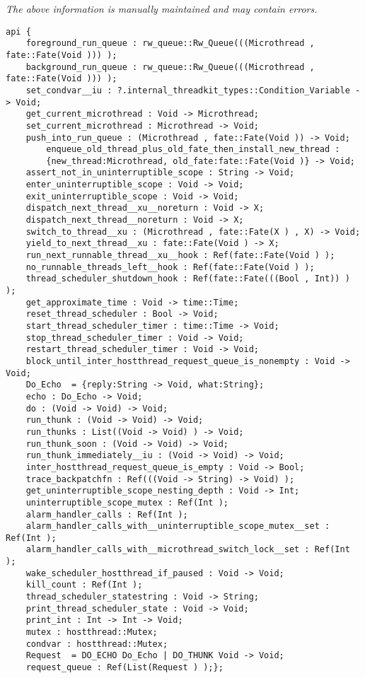 \label{api:Microthread\_Preemptive\_Scheduler}

{\tiny \it The above information is manually maintained and may contain errors.}
\begin{verbatim}
api {
    foreground_run_queue : rw_queue::Rw_Queue(((Microthread , fate::Fate(Void ))) );
    background_run_queue : rw_queue::Rw_Queue(((Microthread , fate::Fate(Void ))) );
    set_condvar__iu : ?.internal_threadkit_types::Condition_Variable -> Void;
    get_current_microthread : Void -> Microthread;
    set_current_microthread : Microthread -> Void;
    push_into_run_queue : (Microthread , fate::Fate(Void )) -> Void;
        enqueue_old_thread_plus_old_fate_then_install_new_thread :
        {new_thread:Microthread, old_fate:fate::Fate(Void )} -> Void;
    assert_not_in_uninterruptible_scope : String -> Void;
    enter_uninterruptible_scope : Void -> Void;
    exit_uninterruptible_scope : Void -> Void;
    dispatch_next_thread__xu__noreturn : Void -> X;
    dispatch_next_thread__noreturn : Void -> X;
    switch_to_thread__xu : (Microthread , fate::Fate(X ) , X) -> Void;
    yield_to_next_thread__xu : fate::Fate(Void ) -> X;
    run_next_runnable_thread__xu__hook : Ref(fate::Fate(Void ) );
    no_runnable_threads_left__hook : Ref(fate::Fate(Void ) );
    thread_scheduler_shutdown_hook : Ref(fate::Fate(((Bool , Int)) ) );
    get_approximate_time : Void -> time::Time;
    reset_thread_scheduler : Bool -> Void;
    start_thread_scheduler_timer : time::Time -> Void;
    stop_thread_scheduler_timer : Void -> Void;
    restart_thread_scheduler_timer : Void -> Void;
    block_until_inter_hostthread_request_queue_is_nonempty : Void -> Void;
    Do_Echo  = {reply:String -> Void, what:String};
    echo : Do_Echo -> Void;
    do : (Void -> Void) -> Void;
    run_thunk : (Void -> Void) -> Void;
    run_thunks : List((Void -> Void) ) -> Void;
    run_thunk_soon : (Void -> Void) -> Void;
    run_thunk_immediately__iu : (Void -> Void) -> Void;
    inter_hostthread_request_queue_is_empty : Void -> Bool;
    trace_backpatchfn : Ref(((Void -> String) -> Void) );
    get_uninterruptible_scope_nesting_depth : Void -> Int;
    uninterruptible_scope_mutex : Ref(Int );
    alarm_handler_calls : Ref(Int );
    alarm_handler_calls_with__uninterruptible_scope_mutex__set : Ref(Int );
    alarm_handler_calls_with__microthread_switch_lock__set : Ref(Int );
    wake_scheduler_hostthread_if_paused : Void -> Void;
    kill_count : Ref(Int );
    thread_scheduler_statestring : Void -> String;
    print_thread_scheduler_state : Void -> Void;
    print_int : Int -> Int -> Void;
    mutex : hostthread::Mutex;
    condvar : hostthread::Mutex;
    Request  = DO_ECHO Do_Echo | DO_THUNK Void -> Void;
    request_queue : Ref(List(Request ) );};
\end{verbatim}
